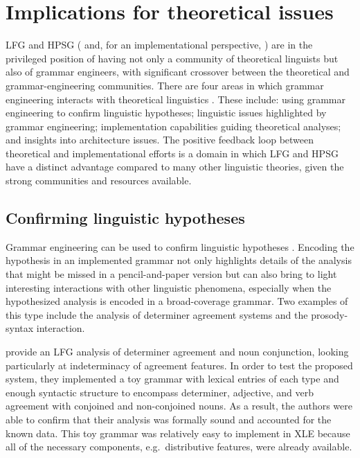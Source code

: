 \documentclass[output=paper,hidelinks]{langscibook}
\begin{document}
%
\section{Implications for theoretical issues}
\label{sec:theoretical_implications}

LFG and HPSG (\citealt{pollard1994head-driven} and, for an implementational perspective, \citealt{benderemerson19}) are in the privileged position of having not only a community of theoretical linguists but also of grammar engineers, with significant crossover between the theoretical and grammar-engineering communities.  There are four areas in which grammar engineering interacts with theoretical linguistics \citep{king2011,king16}.  These include: using grammar engineering to confirm linguistic hypotheses; linguistic issues highlighted by grammar engineering; implementation capabilities guiding theoretical analyses; and insights into architecture issues.   The positive feedback loop between theoretical and implementational efforts is a domain in which LFG and HPSG have a distinct advantage compared to many other linguistic theories, given the strong communities and resources available.

\subsection{Confirming linguistic hypotheses} Grammar engineering can be used to confirm linguistic hypotheses \citep{Bierwisch:63,Mueller99,Buttetal:99,Bender:08,Ben:Fli:Oep:11,king2011,Fokkens:14,king16,MuellerCoreGram}. Encoding the hypothesis in an implemented grammar not only highlights details of the analysis that might be missed in a pencil-and-paper version but can also bring to light interesting interactions with other linguistic phenomena, especially when the hypothesized analysis is encoded in a broad-coverage grammar. Two examples of this type include the analysis of determiner agreement systems and the prosody-syntax interaction.

\cite{kingdalrymple04} provide an LFG analysis of determiner agreement and noun conjunction, looking particularly at indeterminacy of agreement features. In order to test the proposed system, they implemented a toy grammar with lexical entries of each type and enough syntactic structure to encompass determiner, adjective, and verb agreement with conjoined and non-conjoined nouns. As a result, the authors were able to confirm that their analysis was formally sound and accounted for the known data. This toy grammar was relatively easy to implement in XLE because all of the necessary components, e.g.\ distributive features, were already available. 
\end{document}
